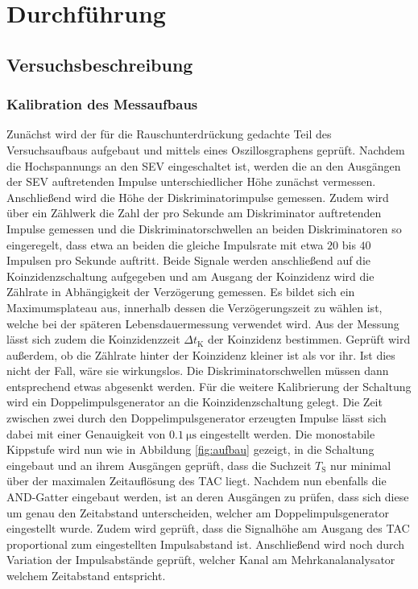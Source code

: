 \section{Durchführung}
\label{sec:Durchführung}



\subsection{Versuchsbeschreibung}
\label{sec:Versuchsbeschreibung}
\subsubsection{Kalibration des Messaufbaus}
Zunächst wird der für die Rauschunterdrückung gedachte Teil des Versuchsaufbaus aufgebaut und mittels eines Oszillosgraphens geprüft.
Nachdem die Hochspannungs an den SEV eingeschaltet ist, werden die an den Ausgängen der SEV auftretenden Impulse unterschiedlicher Höhe zunächst vermessen.
Anschließend wird die Höhe der Diskriminatorimpulse gemessen. Zudem wird über ein Zählwerk die Zahl der pro Sekunde am Diskriminator auftretenden Impulse gemessen und die Diskriminatorschwellen an beiden Diskriminatoren so eingeregelt, dass etwa an beiden die gleiche Impulsrate mit etwa $20$ bis $40$ Impulsen pro Sekunde auftritt.
Beide Signale werden anschließend auf die Koinzidenzschaltung aufgegeben und am Ausgang der Koinzidenz wird die Zählrate  in Abhängigkeit der Verzögerung gemessen. Es bildet sich ein Maximumsplateau aus, innerhalb dessen die Verzögerungszeit zu wählen ist, welche bei der späteren Lebensdauermessung verwendet wird.
Aus der Messung lässt sich zudem die Koinzidenzzeit $\Delta t_{\mathrm{K}}$ der Koinzidenz bestimmen.
Geprüft wird außerdem, ob die Zählrate hinter der Koinzidenz kleiner ist als vor ihr. Ist dies nicht der Fall, wäre sie wirkungslos. Die Diskriminatorschwellen müssen dann entsprechend etwas abgesenkt werden.
Für die weitere Kalibrierung der Schaltung wird ein Doppelimpulsgenerator an die Koinzidenzschaltung gelegt.
Die Zeit zwischen zwei durch den Doppelimpulsgenerator erzeugten Impulse lässt sich dabei mit einer Genauigkeit von $\SI{0.1}{\micro\second}$ eingestellt werden.
Die monostabile Kippstufe wird nun wie in Abbildung \ref{fig:aufbau} gezeigt, in die Schaltung eingebaut und an ihrem Ausgängen geprüft, dass die Suchzeit $T_{\mathrm{S}}$ nur minimal über der maximalen Zeitauflösung des TAC liegt.
Nachdem nun ebenfalls die AND-Gatter eingebaut werden, ist an deren Ausgängen zu prüfen, dass sich diese um genau den Zeitabstand unterscheiden, welcher am Doppelimpulsgenerator eingestellt wurde.
Zudem wird geprüft, dass die Signalhöhe am Ausgang des TAC proportional zum eingestellten Impulsabstand ist.
Anschließend wird noch durch Variation der Impulsabstände geprüft, welcher Kanal am Mehrkanalanalysator welchem Zeitabstand entspricht.


